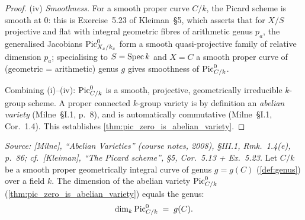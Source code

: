 \begin{proof}
  (iv) \emph{Smoothness.} For a smooth proper curve \(C/k\), the
  Picard scheme is smooth at \(0\): this is Exercise~5.23 of
  Kleiman~\S 5, which asserts that for \(X/S\) projective and flat
  with integral geometric fibres of arithmetic genus \(p_a\), the
  generalised Jacobians \(\operatorname{Pic}^0_{X_s/k_s}\) form a smooth
  quasi-projective family of relative dimension \(p_a\); specialising
  to \(S = \operatorname{Spec} k\) and \(X = C\) a smooth proper curve of (geometric
  = arithmetic) genus \(g\) gives smoothness of \(\operatorname{Pic}^0_{C/k}\).

  Combining (i)--(iv): \(\operatorname{Pic}^0_{C/k}\) is a smooth, projective,
  geometrically irreducible \(k\)-group scheme. A proper connected
  \(k\)-group variety is by definition an \emph{abelian variety}
  (Milne~\S I.1, p.~8), and is automatically commutative (Milne~\S I.1,
  Cor.~1.4). This establishes
  \cref{thm:pic_zero_is_abelian_variety}.
\end{proof}

\begin{theorem}\leanok
  \label{thm:pic_zero_dimension_equals_genus}

  \textit{Source: [Milne], ``Abelian Varieties'' (course notes, 2008),
  \S III.1, Rmk.~1.4(e), p.~86; cf.\ [Kleiman], ``The Picard scheme'',
  \S 5, Cor.~5.13 + Ex.~5.23.}
  Let \(C/k\) be a smooth proper geometrically integral curve of genus
  \(g = g(C)\) (\cref{def:genus}) over a field \(k\). The dimension of
  the abelian variety \(\operatorname{Pic}^0_{C/k}\)
  (\cref{thm:pic_zero_is_abelian_variety}) equals the genus:
  \[
    \dim_k \operatorname{Pic}^0_{C/k} \;=\; g(C).
  \]
\end{theorem}

